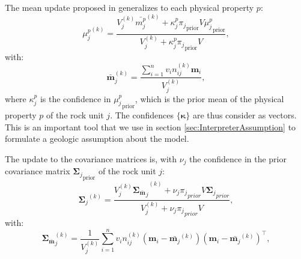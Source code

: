 
The mean update proposed in \citet{ggz389} generalizes to each physical property $p$:
\begin{equation}
{\mu_j^p}^{(k)}=\frac{V_{j}^{(k)}{\bar{{m}^p_j}}^{(k)} + \kappa^p_j {\pi_j}_{\text{prior}} V {\mu^p_j}_{\text{prior}}}{V_{j}^{(k)}+\kappa_j^p {\pi_j}_{\text{prior}} V} \label{eq:mu_update},
\end{equation}
with:
\begin{equation}
{\bar{\mathbf{m}}}_j^{(k)} = \frac{\sum^n_{i=1} v_i n_{ij}^{(k)} \mathbf{m}_i}{V_{j}^{(k)}},
\end{equation}
where $\kappa_j^p$ is the confidence in ${{\mu^p_j}_{\text{prior}}}$, which is the prior mean of the physical property $p$ of the rock unit $j$. The confidences $\{\mathbf{\kappa}\}$ are thus consider as vectors. This is an important tool that we use in section \ref{sec:InterpreterAssumption} to formulate a geologic assumption about the model.

The update to the covariance matrices is, with $\nu_j$ the confidence in the prior covariance matrix ${\mathbf{\Sigma}_j}_{\text{prior}}$ of the rock unit $j$:
\begin{equation}
{\mathbf{\Sigma}_j}^{(k)} = \frac{{{V_{j}^{(k)}} {\mathbf{\Sigma}_{\bar{\mathbf{m}}}}_j}^{(k)} + \nu_j {\pi_j}_{prior} V {\mathbf{\Sigma}_j}_{prior}}
{{V_{j}^{(k)}} + \nu_j {\pi_j}_{prior} V} \label{eq:sig_update},
\end{equation}
with:
\begin{equation}
{\mathbf{\Sigma}_{\bar{\mathbf{m}}}}_j^{(k)} =\frac{1}{{V_{j}^{(k)}}} \sum_{i=1}^{n} v_i n_{ij}^{(k)}(\mathbf{m}_i-\bar{\mathbf{m}_j}^{(k)})(\mathbf{m}_i-\bar{\mathbf{m}_j}^{(k)})^\top,
\end{equation}

